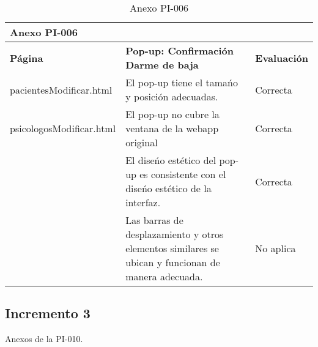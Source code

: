 \begin{table}[htpb]
\centering
\begin{tabularx}{\textwidth}{|l|X|l|}
\hline
\multicolumn{3}{|l|}{\textbf{Anexo PI-006}}                                                                                                  \\ \hline
\textbf{Página}        & \textbf{Pop-up: Confirmación Darme de baja}                                                      & \textbf{Evaluación} \\ \hline
pacientesModificar.html  & El pop-up tiene el tamańo y posición adecuadas.                                                    & Correcta              \\ \cline{2-3} 
psicologosModificar.html & El pop-up no cubre la ventana de la webapp original                                                & Correcta              \\ \cline{2-3} 
                         & El diseńo estético del pop-up es consistente con el diseńo estético de la interfaz.                & Correcta              \\ \cline{2-3} 
                         & Las barras de desplazamiento y otros elementos similares se ubican y funcionan de manera adecuada. & No aplica \\ \hline   
\end{tabularx}
\caption{Anexo PI-006}
\end{table}

\clearpage

\subsection{Incremento 3}

Anexos de la PI-010.

